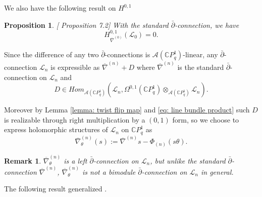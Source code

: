 \documentclass[12pt]{article}
\newtheorem{remark}[definition]{Remark}
\newtheorem{proposition}[definition]{Proposition}
\numberwithin{equation}{section}
\def\pb{\bar{\partial}}
\def\nb{\bar{\nabla}_\theta}
\def\nb{\overline{\nabla}_\theta}
\def\C{{\mathbb C}}
\def\A{\mathcal{A}}
\def\L{\mathcal{L}}
\begin{document}
We also have the following result on $H^{0,1}$
\begin{proposition}\label{prop: 0,1th cohomology for L0}[\cite{d2013geometry} Proposition 7.2]
    With the standard $\pb$-connection, we have
\begin{equation}
H^{0,1}_{\overline{\nabla}^{(0)}}(\L_0)=0.
\end{equation}
\end{proposition}



Since the difference of any two $\pb$-connections is $\A(\C P^1_q)$-linear, any $\pb$-connection $\L_n$ is expressible as $\overline{\nabla}^{(n)} + D$ where $\overline{\nabla}^{(n)}$ is the standard $\pb$-connection on $\L_n$ and $$D \in Hom_{\A(\C P^1_q)}(\L_n, \Omega^{0,1}(\C P^1_q) \otimes_{\A(\C P^1_q)} \L_n).$$ 



Moreover by Lemma \ref{lemma: twist flip map} and \eqref{eq: line bundle product} such $D$ is realizable through right multiplication by a $(0,1)$ form, so we choose to express holomorphic structures of $\L_n$ on $\C P^1_q$ as
\begin{equation}\label{eq: pb-connections omega}
    \nb^{(n)}(s) := \overline{\nabla}^{(n)} s - \Phi_{(n)}(s\theta).
\end{equation}

\begin{remark}
    $\nb^{(n)}$  is a left $\pb$-connection on $\L_n$, but unlike the standard $\pb$-connection $\overline{\nabla}^{(n)}$, $\nb^{(n)}$ is not a bimodule $\pb$-connection on $\L_n$ in general.
\end{remark}

The following result generalized \cite[Proposition 3.8]{khalkhali2011holomorphic}.
\end{document}
